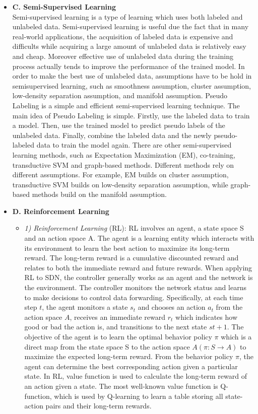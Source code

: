 \begin{itemize}
\begin{itemize}
\begin{itemize}
\end{itemize}
\end{itemize}
\item[] \textbf{C. Semi-Supervised Learning}\\
Semi-supervised learning is a type of learning which uses both labeled and unlabeled data. Semi-supervised learning is useful due the fact that in many real-world applications, the acquisition of labeled data is expensive and difficults while acquiring a large amount of unlabeled data is relatively easy and cheap. Moreover effective use of unlabeled data during the training process actually tends to improve the performance of the trained model. In order to make the best use of unlabeled data, assumptions have to be hold in semisupervised learning, such as smoothness assumption, cluster assumption, low-density separation assumption, and manifold assumption. Pseudo Labeling \cite{Wu2018} is a simple and efficient semi-supervised learning technique. The main idea of Pseudo Labeling is simple. Firstly, use the labeled data to train a model. Then, use the trained model to predict pseudo labels of the unlabeled data. Finally, combine the labeled data and the newly pseudo-labeled data to train the model again. There are other semi-supervised learning methods, such as Expectation Maximization (EM), co-training, transductive SVM and graph-based methods. Different methods rely on different assumptions. For example, EM builds on cluster assumption, transductive SVM builds on low-density separation assumption, while graph-based methods build on the manifold assumption.
\item[]\textbf{D. Reinforcement Learning}
\begin{itemize}
\item[]\textit{1)	Reinforcement Learning} (RL): RL \cite{Sutton2018, Kaelbling1996} involves an agent, a state space S and an action space A. The agent is a learning entity which interacts with its environment to learn the best action to maximize its long-term reward. The long-term reward is a cumulative discounted reward and relates to both the immediate reward and future rewards. When applying RL to SDN, the controller generally works as an agent and the network is the environment. The controller monitors the network status and learns to make decisions to control data forwarding. Specifically, at each time step $t$, the agent monitors a state $s_{t}$ and chooses an action $a_{t}$ from the action space $A$, receives an immediate reward $r_{t}$ which indicates how good or bad the action is, and transitions to the next state $st+1$. The objective of the agent is to learn the optimal behavior policy $\pi$ which is a direct map from the state space S to the action space $A (\pi : S \longrightarrow A)$ to maximize the expected long-term reward. From the behavior policy $\pi$, the agent can determine the best corresponding action given a particular state. In RL, value function is used to calculate the long-term reward of an action given a state. The most well-known value function is Q-function, which is used by Q-learning to learn a table storing all state-action pairs and their long-term rewards.

\end{itemize}
\end{itemize}
